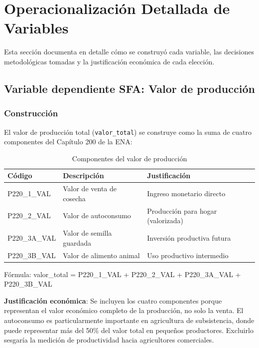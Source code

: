 \documentclass[11pt,a4paper]{article}
\begin{document}
\section{Operacionalización Detallada de Variables}

Esta sección documenta en detalle cómo se construyó cada variable, las decisiones metodológicas tomadas y la justificación económica de cada elección.

\subsection{Variable dependiente SFA: Valor de producción}

\subsubsection{Construcción}
El valor de producción total (\texttt{valor\_total}) se construye como la suma de cuatro componentes del Capítulo 200 de la ENA:

\begin{table}[H]
\centering
\caption{Componentes del valor de producción}
\label{tab:valor_components}
\begin{threeparttable}
\small
\begin{tabular}{p{2.5cm}p{6cm}p{4.5cm}}
\toprule
\textbf{Código} & \textbf{Descripción} & \textbf{Justificación} \\
\midrule
P220\_1\_VAL & Valor de venta de cosecha & Ingreso monetario directo \\
P220\_2\_VAL & Valor de autoconsumo & Producción para hogar (valorizada) \\
P220\_3A\_VAL & Valor de semilla guardada & Inversión productiva futura \\
P220\_3B\_VAL & Valor de alimento animal & Uso productivo intermedio \\
\bottomrule
\end{tabular}
\begin{tablenotes}
\footnotesize
\item Fórmula: valor\_total = P220\_1\_VAL + P220\_2\_VAL + P220\_3A\_VAL + P220\_3B\_VAL
\end{tablenotes}
\end{threeparttable}
\end{table}

\textbf{Justificación económica}: Se incluyen los cuatro componentes porque representan el valor económico completo de la producción, no solo la venta. El autoconsumo es particularmente importante en agricultura de subsistencia, donde puede representar más del 50\% del valor total en pequeños productores. Excluirlo sesgaría la medición de productividad hacia agricultores comerciales.
\end{document}

